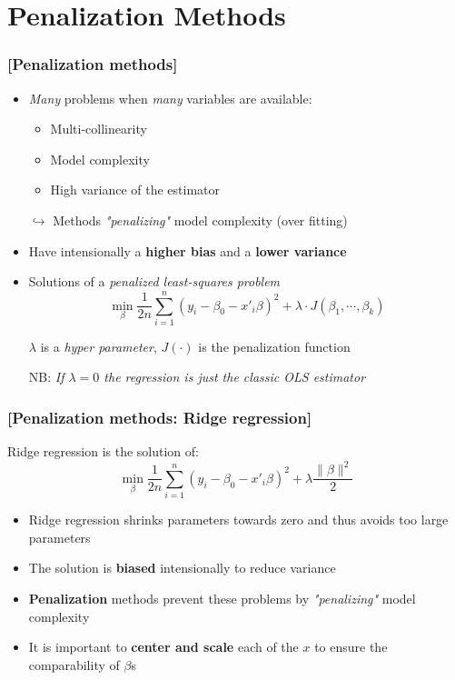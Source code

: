 \documentclass[xcolor=x11names,compress, aspectratio=169]{beamer}
\renewcommand{\(}{\begin{columns}}
\renewcommand{\)}{\end{columns}}
\newcommand{\<}[1]{\begin{column}{#1}}
\renewcommand{\>}{\end{column}}
\begin{document}
\section{Penalization Methods}

\begin{frame} %
\frametitle{\textcolor{brique}{[Penalization methods]}}
\pause
\begin{itemize}[<+->]
\item \textit{Many} problems when \textit{many} variables are available:
 \begin{itemize}[<+->]
        \item Multi-collinearity
        \item Model complexity
        \item High variance of the estimator
    \end{itemize}
\item[$\hookrightarrow$]  Methods  \emph{"penalizing"} model complexity (over fitting)
\item Have intensionally a \textbf{higher bias} and a \textbf{lower variance}
\item Solutions of a \textit{ penalized least-squares problem}$$
\min_{\beta} \frac{1}{2n}
     \sum_{i=1}^{n}{ \left( y_i - \beta_0 - x'_i\beta\right)^{2} } +
\lambda \cdot J(\beta_1, \cdots, \beta_k)
$$
\item[] $\lambda$ is a \textit{hyper parameter}, $J(\cdot)$ is the penalization function
\item[NB:] \textit{If $\lambda = 0$ the regression is just the classic OLS estimator}
\end{itemize}
\end{frame}

\begin{frame} %
\frametitle{\textcolor{brique}{[Penalization methods: Ridge regression]}}
Ridge regression is  the solution of:
$$
\min_{\beta} \frac{1}{2n}
\sum_{i=1}^{n}{ \left( y_i - \beta_0 - x'_i\beta\right)^{2} } +
\lambda \frac{\| \beta\|^{2}}{2}
$$
\pause
\begin{itemize}[<+->]
\item Ridge regression shrinks parameters towards zero and thus avoids too large parameters
\item The solution is \textbf{biased} intensionally to reduce variance
\item \textbf{Penalization} methods prevent these problems by \emph{"penalizing"} model complexity
\item It is important to \textbf{center and scale}  each of the $x$ to ensure the comparability of $\beta$s
\end{itemize}
\end{frame}
\end{document}
